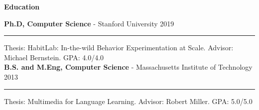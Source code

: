 \documentclass[10pt,A4]{article}
\newcommand{\cvsection}[1]
{
	\begin{center}
		\large\textcolor{sectcol}{\textbf{#1}}
	\end{center}
}
\newcommand{\cvevent}[5]
{

	\textbf{#2} - \textcolor{bgcol}{#3} \hfill \vspace{2.5pt}\textcolor{sectcol}{#1}

\vspace{-8pt}
\textcolor{softcol}{\hrule}
\vspace{6pt}

  #4\\[3pt]
  #5\\[6pt]

}
\newcommand{\cvevtone}[4]
{

	\textbf{#2} - \textcolor{bgcol}{#3} \hfill \vspace{2.5pt}\textcolor{sectcol}{#1}

\vspace{-8pt}
\textcolor{softcol}{\hrule}
\vspace{6pt}

  #4\\[3pt]

}
\begin{document}



\cvsection{Education}

\cvevtone{2019}{Ph.D, Computer Science}{Stanford University}{Thesis: HabitLab: In-the-wild Behavior Experimentation at Scale. Advisor: Michael Bernstein. \hfill GPA: 4.0/4.0}%


%
\cvevtone{2013}{B.S. and M.Eng, Computer Science}{Massachusetts Institute of Technology}{Thesis: Multimedia for Language Learning. Advisor: Robert Miller. \hfill GPA: 5.0/5.0}


%


%


%
%
\end{document}
